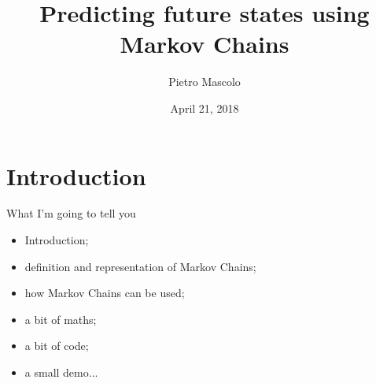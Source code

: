 \documentclass[10pt]{beamer}
\author[PM]{Pietro Mascolo}
\title[Predicting the future]{Predicting future states using Markov Chains}
\institute[Optum]{\textbf{\Large{Optum Ireland Ltd.}}}
\date{\tiny{April 21, 2018}}
\newif\ifplacelogo %
\begin{document}
	\begin{frame}
		\titlepage
	\end{frame}


	\section{Introduction}
	
	\begin{frame}{What I'm going to tell you}
	\placelogofalse

		\begin{itemize}
			\item Introduction;
			\item definition and representation of Markov Chains;
			\item how Markov Chains can be used;
			\item a bit of maths;
			\item a bit of code;
			\item a small demo...
		\end{itemize}
		
	\end{frame}
\end{document}
